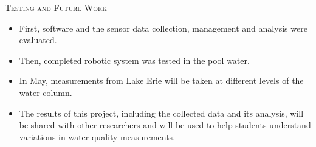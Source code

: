 \documentclass[final,t]{beamer}
\begin{document}
\begin{frame}{}
\begin{columns}
\begin{column}{.5\linewidth}
                \begin{alertblock}{\textsc{Testing and Future Work}}
                    \vspace*{3mm}
                    \begin{itemize}
                    	\item First, software and the sensor data collection, management and analysis were evaluated.
                    	\item Then, completed robotic system was tested in the pool water.
                    	\item In May, measurements from Lake Erie will be taken at different levels of the water column.
                    	\item The results of this project, including the collected data and its analysis, will be shared with other researchers and will be used to help students understand variations in water quality measurements.
                    \end{itemize}


                    \vspace*{3mm}
                \end{alertblock}
            \end{column}


        \end{columns}
    \end{frame}
\end{document}
